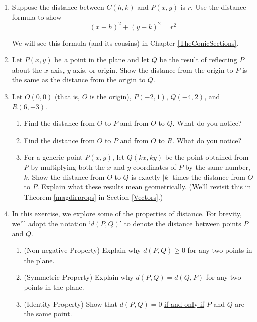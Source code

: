 \documentclass{ximera}
\begin{document}
\begin{enumerate}
\item  Suppose the distance between  $C(h,k)$ and $P(x,y)$ is $r$.  Use the distance formula to show \[(x-h)^2 + (y-k)^2 = r^2\]

We will see this formula (and its cousins) in Chapter \ref{TheConicSections}.


\item  Let $P(x,y)$ be a point in the plane and let $Q$ be the result of reflecting $P$ about the $x$-axis, $y$-axis, or origin.  Show the distance from the origin to $P$ is the same as the distance from the origin to $Q$.  


\item \label{scalingdistance} Let $O(0,0)$ (that is, $O$ is the origin),  $P(-2,1)$, $Q(-4,2)$, and $R(6,-3)$.  

\begin{enumerate}

\item  Find the distance from $O$ to $P$ and from $O$ to $Q$.  What do you notice?

\item  Find the distance from $O$ to $P$ and from $O$ to $R$.  What do you notice?

\item  For a generic point $P(x,y)$, let $Q(kx, ky)$ be the point obtained from $P$ by multiplying both the $x$ and $y$ coordinates of $P$ by the same number, $k$.  Show the distance from $O$ to $Q$ is exactly $|k|$ times the distance from $O$ to $P$.  Explain what these results mean geometrically. (We'll revisit this in Theorem \ref{magdirprops} in Section \ref{Vectors}.)

\end{enumerate}


\item \label{distancemetricprops} In this exercise, we explore some of the properties of distance.  For brevity, we'll adopt the notation `$d(P,Q)$' to denote the distance between points $P$ and $Q$.
\begin{enumerate}  

\item  (Non-negative Property) Explain why $d(P,Q) \geq 0$ for any two points in the plane.

\item  (Symmetric Property) Explain why $d(P,Q) = d(Q,P)$ for any two points in the plane.

\item  (Identity Property) Show that $d(P,Q) = 0$ \underline{if and only if} $P$ and $Q$ are the same point.


\end{enumerate}
\end{enumerate}
\end{document}
